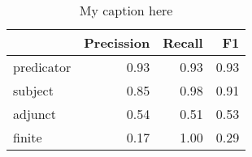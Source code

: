 \begin{table}[!ht]
\centering
\begin{tabular}{lrrr}
\toprule
{} &  Precission &  Recall &   F1 \\
\midrule
predicator &        0.93 &    0.93 & 0.93 \\
subject    &        0.85 &    0.98 & 0.91 \\
adjunct    &        0.54 &    0.51 & 0.53 \\
finite     &        0.17 &    1.00 & 0.29 \\
\bottomrule
\end{tabular}
\caption{My caption here}
\label{tab:unit-elements-ocd-exact-F1}
\end{table}
